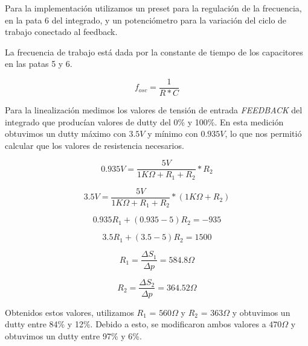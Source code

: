 \documentclass[11pt, a4paper]{article}
\begin{document}
Para la implementación utilizamos un preset para la regulación de la frecuencia, en la pata 6 del integrado, y un potenciómetro para la variación del ciclo de trabajo conectado al feedback.

La frecuencia de trabajo está dada por la constante de tiempo de los capacitores en las patas 5 y 6.

\begin{equation}
f_{osc} = \frac{1}{R * C} 
\end{equation}

Para la linealización medimos los valores de tensión de entrada \textit{FEEDBACK} del integrado que producían valores de dutty del 0\% y 100\%. En esta medición obtuvimos un dutty máximo con $3.5V$ y mínimo con $0.935V$, lo que nos permitió calcular que los valores de resistencia necesarios.

\begin{equation}
0.935V = \frac{5V}{1K\Omega + R_1 + R_2} * R_2
\end{equation}

\begin{equation}
3.5V  = \frac{5V}{1K\Omega + R_1 + R_2} * (1K\Omega + R_2)
\end{equation}

\begin{equation}
0.935 R_1 + (0.935 - 5) R_2 = -935
\end{equation}

\begin{equation}
3.5 R_1 + (3.5 - 5) R_2 = 1500
\end{equation}

\begin{equation}
R_1 = \frac{\Delta S_1}{\Delta p} = 584.8 \Omega
\end{equation}

\begin{equation}
R_2 = \frac{\Delta S_2}{\Delta p} = 364.52 \Omega
\end{equation}

Obtenidos estos valores, utilizamos $R_1$ = $560\Omega$ y $R_2$ = $363\Omega$ y obtuvimos un dutty entre 84\% y 12\%. Debido a esto, se modificaron ambos valores a $470\Omega$ y obtuvimos un dutty entre 97\% y 6\%.
\end{document}

